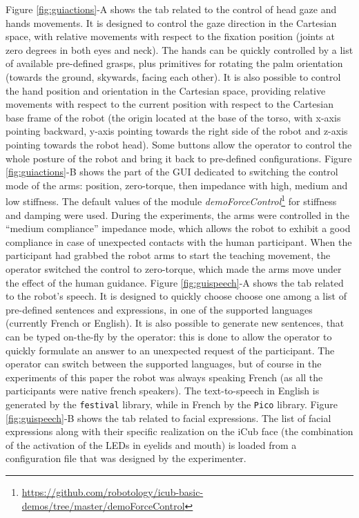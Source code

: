 \documentclass[twocolumn]{svjour3}          %
\begin{document}
Figure \ref{fig:guiactions}-A shows the tab related to the control of head gaze and hands movements. It is designed to control the gaze direction in the Cartesian space, with relative movements with respect to the fixation position (joints at zero degrees in both eyes and neck). The hands can be quickly controlled by a list of available pre-defined grasps, plus primitives for rotating the palm orientation (towards the ground, skywards, facing each other). It is also possible to control the hand position and orientation in the Cartesian space, providing relative movements with respect to the current position with respect to the Cartesian base frame of the robot (the origin located at the base of the torso, with x-axis pointing backward, y-axis pointing towards the right side of the robot and z-axis pointing towards the robot head). Some buttons allow the operator to control the whole posture of the robot and bring it back to pre-defined configurations. 
Figure \ref{fig:guiactions}-B shows the part of the GUI dedicated to switching the control mode of the arms: position, zero-torque, then impedance with high, medium and low stiffness. The default values of the module \textit{demoForceControl}\footnote{\url{https://github.com/robotology/icub-basic-demos/tree/master/demoForceControl}} for stiffness and damping were used. During the experiments, the arms were controlled in the ``medium compliance'' impedance mode, which allows the robot to exhibit a good compliance in case of unexpected contacts with the human participant. When the participant had grabbed the robot arms to start the teaching movement, the operator switched the control to zero-torque, which made the arms move under the effect of the human guidance. 
Figure \ref{fig:guispeech}-A shows the tab related to the robot's speech. It is designed to quickly choose choose one among a list of pre-defined sentences and expressions, in one of the supported languages (currently French or English). It is also possible to generate new sentences, that can be typed on-the-fly by the operator: this is done to allow the operator to quickly formulate an answer to an unexpected request of the participant. The operator can switch between the supported languages, but of course in the experiments of this paper the robot was always speaking French (as all the participants were native french speakers). The text-to-speech in English is generated by the \texttt{festival} library, while in French by the \texttt{Pico} library. 
Figure \ref{fig:guispeech}-B shows the tab related to facial expressions. The list of facial expressions along with their specific realization on the iCub face (the combination of the activation of the LEDs in eyelids and mouth) is loaded from a configuration file that was designed by the experimenter. 
\end{document}
